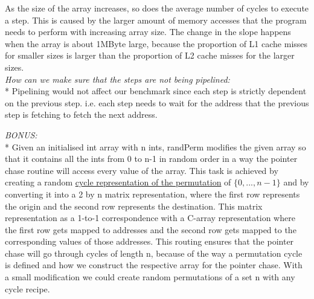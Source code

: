 \documentclass[11pt,letter]{article}
\begin{document}
\noindent As the size of the array increases, so does the average number of cycles to execute a step. This is caused by the larger amount of memory accesses that the program needs to perform with increasing array size. The change in the slope happens when the array is about 1MByte large, because the proportion of L1 cache misses for smaller sizes is larger than the proportion of L2 cache misses for the larger sizes. \\[10pt]

\noindent\emph{How can we make sure that the steps are not being pipelined:}\\*
Pipelining would not affect our benchmark since each step is strictly dependent on the previous step. i.e. each step needs to wait for the address that the previous step is fetching to fetch the next address.
\pagebreak

\noindent\emph{BONUS:}\\*
Given an initialised int array with n ints, randPerm modifies the given array so that it contains all the ints from 0 to n-1 in random order in a way the pointer chase routine will access every value of the array. This task is achieved by creating a random \href{http://mathworld.wolfram.com/PermutationCycle.html}{cycle representation of the permutation} of $\{0, ... , n-1\}$ and by converting it into a 2 by n matrix representation, where the first row represents the origin and the second row represents the destination. This matrix representation as a 1-to-1 correspondence with a C-array representation where the first row gets mapped to addresses and the second row gets mapped to the corresponding values of those addresses. This routing ensures that the pointer chase will go through cycles of length n, because of the way a permutation cycle is defined and how we construct the respective array for the pointer chase. With a small modification we could create random permutations of a set n with any cycle recipe.
\end{document}
